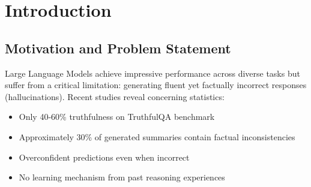 \documentclass[12pt,a4paper]{article}
\theoremstyle{definition}
\begin{document}
\newpage

\tableofcontents
\newpage

\section{Introduction}

\subsection{Motivation and Problem Statement}

Large Language Models achieve impressive performance across diverse tasks but suffer from a critical limitation: generating fluent yet factually incorrect responses (hallucinations). Recent studies reveal concerning statistics:

\begin{itemize}
    \item Only 40-60\% truthfulness on TruthfulQA benchmark \cite{lin2022truthfulqa}
    \item Approximately 30\% of generated summaries contain factual inconsistencies
    \item Overconfident predictions even when incorrect
    \item No learning mechanism from past reasoning experiences
\end{itemize}
\end{document}
